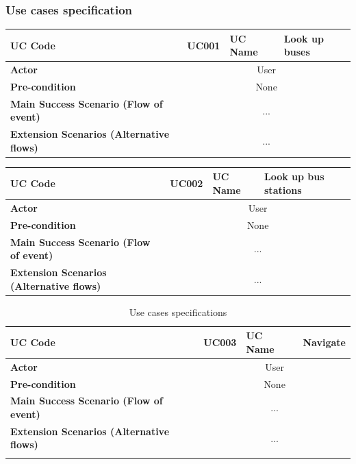 	\subsubsection{Use cases specification}
		\begin{center}
			\begin{longtable}{|p{3cm}||p{3cm}|p{3cm}|p{4cm}|} 
				\hline
				\bfseries UC Code & UC001 & \bfseries UC Name & Look up buses \\ 
				\hline
				\bfseries Actor & \multicolumn{3}{|c|}{User} \\
				\hline
				\bfseries Pre-condition & \multicolumn{3}{|c|}{None} \\
				\hline
				\bfseries Main Success Scenario (Flow of event) & \multicolumn{3}{|c|}{...} \\
				\hline
				\bfseries Extension Scenarios (Alternative flows) & \multicolumn{3}{|c|}{...} \\
				\hline
			\end{longtable}

			\begin{longtable}{|p{3cm}||p{3cm}|p{3cm}|p{4cm}|} 
				\hline
				\bfseries UC Code & UC002 & \bfseries UC Name & Look up bus stations \\ 
				\hline
				\bfseries Actor & \multicolumn{3}{|c|}{User} \\
				\hline
				\bfseries Pre-condition & \multicolumn{3}{|c|}{None} \\
				\hline
				\bfseries Main Success Scenario (Flow of event) & \multicolumn{3}{|c|}{...} \\
				\hline
				\bfseries Extension Scenarios (Alternative flows) & \multicolumn{3}{|c|}{...} \\
				\hline
			\end{longtable}

			\begin{longtable}{|p{3cm}||p{3cm}|p{3cm}|p{4cm}|} 
				\hline
				\bfseries UC Code & UC003 & \bfseries UC Name & Navigate \\ 
				\hline
				\bfseries Actor & \multicolumn{3}{|c|}{User} \\
				\hline
				\bfseries Pre-condition & \multicolumn{3}{|c|}{None} \\
				\hline
				\bfseries Main Success Scenario (Flow of event) & \multicolumn{3}{|c|}{...} \\
				\hline
				\bfseries Extension Scenarios (Alternative flows) & \multicolumn{3}{|c|}{...} \\
				\hline
				\caption{Use cases specifications} 
				\label{table:use_cases_specifications} 
			\end{longtable}

		\end{center}

